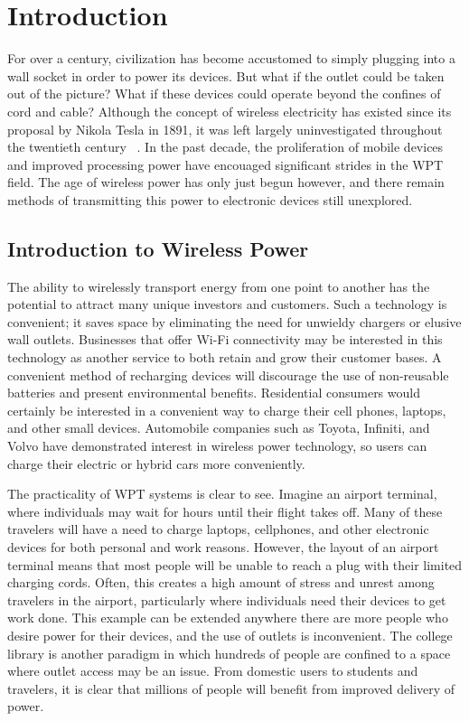 \chapter{Introduction}
\label{ch:introduction}

For over a century, civilization has become accustomed to simply plugging into a wall socket in order to power its devices. But what if the outlet could be taken out of the picture? What if these devices could operate beyond the confines of cord and cable? Although the concept of wireless electricity has existed since its proposal by Nikola Tesla in 1891, it was left largely uninvestigated throughout the twentieth century ~\cite{NikkiT}. In the past decade, the proliferation of mobile devices and improved processing power have encouaged significant strides in the WPT field. The age of wireless power has only just begun however, and there remain methods of transmitting this power to electronic devices still unexplored.

\section{Introduction to Wireless Power}
The ability to wirelessly transport energy from one point to another has the potential to attract many unique investors and customers. Such a technology is convenient; it saves space by eliminating the need for unwieldy chargers or elusive wall outlets. Businesses that offer Wi-Fi connectivity may be interested in this technology as another service to both retain and grow their customer bases. A convenient method of recharging devices will discourage the use of non-reusable batteries and present environmental benefits. Residential consumers would certainly be interested in a convenient way to charge their cell phones, laptops, and other small devices. Automobile companies such as Toyota, Infiniti, and Volvo have demonstrated interest in wireless power technology, so users can charge their electric or hybrid cars more conveniently. 

The practicality of WPT systems is clear to see. Imagine an airport terminal, where individuals may wait for hours until their flight takes off. Many of these travelers will have a need to charge laptops, cellphones, and other electronic devices for both personal and work reasons. However, the layout of an airport terminal means that most people will be unable to reach a plug with their limited charging cords. Often, this creates a high amount of stress and unrest among travelers in the airport, particularly where individuals need their devices to get work done. This example can be extended anywhere there are more people who desire power for their devices, and the use of outlets is inconvenient. The college library is another paradigm in which hundreds of people are confined to a space where outlet access may be an issue. From domestic users to students and travelers, it is clear that millions of people will benefit from improved delivery of power.

